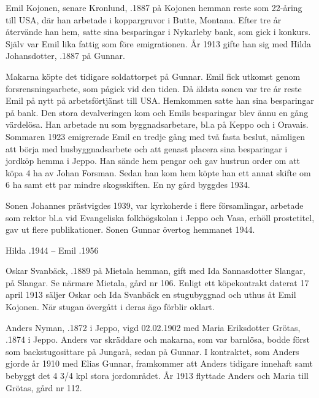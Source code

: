 Emil Kojonen, senare Kronlund, .1887 på Kojonen hemman reste som 22-åring till USA, där han arbetade i koppargruvor i Butte, Montana. Efter tre år återvände han hem, satte sina besparingar i Nykarleby bank, som gick i konkurs. Själv var Emil lika fattig som före emigrationen. År 1913 gifte han sig med Hilda Johansdotter, .1887 på Gunnar.
\begin{jhchildren}
  \item {}
  \item {}
\end{jhchildren}
Makarna köpte det tidigare soldattorpet på Gunnar. Emil fick utkomst genom forsrensningsarbete, som pågick vid den tiden. Då äldsta sonen var tre år reste Emil på nytt på arbetsförtjänst till USA. Hemkommen satte han sina besparingar på bank. Den stora devalveringen kom och Emils besparingar blev ännu en gång värdelösa. Han arbetade nu som byggnadsarbetare, bl.a på Keppo och i Oravais.
Sommaren 1923 emigrerade Emil en tredje gång med två fasta beslut, nämligen att börja med husbyggnadsarbete och att genast placera sina besparingar i jordköp hemma i Jeppo. Han sände hem pengar och gav hustrun order om att köpa 4 ha av Johan Forsman. Sedan han kom hem köpte han ett annat skifte om 6 ha samt ett par mindre skogsskiften. En ny gård byggdes 1934.

Sonen Johannes prästvigdes 1939, var kyrkoherde i flere församlingar, arbetade som rektor bl.a vid  Evangeliska folkhögskolan i Jeppo och Vasa, erhöll prostetitel, gav ut flere publikationer. Sonen Gunnar övertog hemmanet 1944.

Hilda .1944  --  Emil .1956


Oskar Svanbäck, .1889 på Mietala hemman, gift med Ida Sannasdotter Slangar,  på Slangar. Se närmare Mietala, gård nr 106. Enligt ett köpekontrakt daterat 17 april 1913 säljer Oskar och Ida Svanbäck en stugubyggnad och uthus åt Emil Kojonen. När stugan övergått i deras ägo förblir oklart.


Anders Nyman, .1872 i Jeppo, vigd 02.02.1902 med Maria Eriksdotter Grötas, .1874 i Jeppo. Anders var skräddare och makarna, som var barnlösa, bodde först som backstugosittare på Jungarå, sedan på Gunnar. I kontraktet, som Anders gjorde år 1910 med Elias Gunnar, framkommer att Anders tidigare innehaft samt bebyggt det 4 3/4 kpl stora jordområdet. År 1913 flyttade Anders och Maria till Grötas, gård nr 112.


